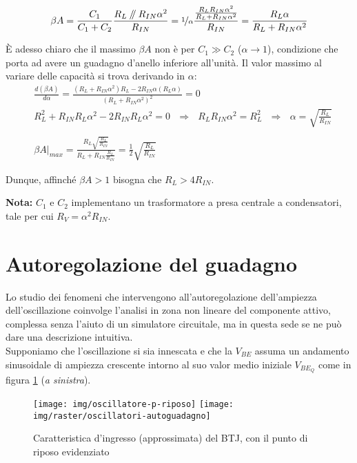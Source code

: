 \[
\beta A = \frac{C_1}{C_1 + C_2} \frac{R_L \parallel R_{IN} \alpha^2}{R_{IN}} = 
\nicefrac{1}{\alpha}
\frac{\frac{R_L R_{IN} \alpha^2}{R_L + R_{IN} \alpha^2}}{R_{IN}}=
\frac{R_L \alpha}{R_L + R_{IN} \alpha^2}
\]

È adesso chiaro che il massimo $\beta A$ non è per $C_1 \gg C_2$ ($\alpha \rightarrow 1$), condizione che porta ad avere un guadagno d'anello inferiore all'unità. Il valor massimo al variare delle capacità si trova derivando in $\alpha$:
\begin{align*}
&\frac{d(\beta A)}{d\alpha} = \frac{(R_L + R_{IN} \alpha^2) R_L - 2 R_{IN} \alpha (R_L \alpha)}{(R_L + R_{IN}\alpha^2)^2} = 0
\\
&R_L^2 + R_{IN} R_L \alpha^2 - 2 R_{IN} R_L \alpha^2 = 0
~~~ \Rightarrow ~~~
R_L R_{IN} \alpha^2 = R_L^2
~~~ \Rightarrow ~~~
\alpha = \sqrt{\frac{R_L}{R_{IN}}}
\\\\
&\beta A |_{max} =
\frac{R_L \sqrt{\frac{R_L}{R_{IN}}}}{R_L + R_{IN} \frac{R_L}{R_{IN}}}=
\frac{1}{2}\sqrt{\frac{R_L}{R_{IN}}}
\end{align*}

Dunque, affinché $\beta A > 1$ bisogna che $R_L> 4R_{IN}$.

\textbf{Nota:} $C_1$ e $C_2$ implementano un trasformatore a presa centrale a condensatori, tale per cui $R_V = \alpha^2 R_{IN}$.

\section{Autoregolazione del guadagno}
Lo studio dei fenomeni che intervengono all'autoregolazione dell'ampiezza dell'oscillazione coinvolge l'analisi in zona non lineare del componente attivo, complessa senza l'aiuto di un simulatore circuitale, ma in questa sede se ne può dare una descrizione intuitiva.\\
Supponiamo che l'oscillazione si sia innescata e che la $V_{BE}$ assuma un andamento sinusoidale di ampiezza crescente intorno al suo valor medio iniziale $V_{BE_Q}$ come in figura \ref{fig:oscillatore-punto-riposo} (\textit{a sinistra}).

\begin{figure}[hbt]
	\centering
	\texttt{[image: img/oscillatore-p-riposo]}
	\texttt{[image: img/raster/oscillatori-autoguadagno]}
	\caption{Caratteristica d'ingresso (approssimata) del BTJ, con il punto di riposo evidenziato}
	\label{fig:oscillatore-punto-riposo}
\end{figure}

